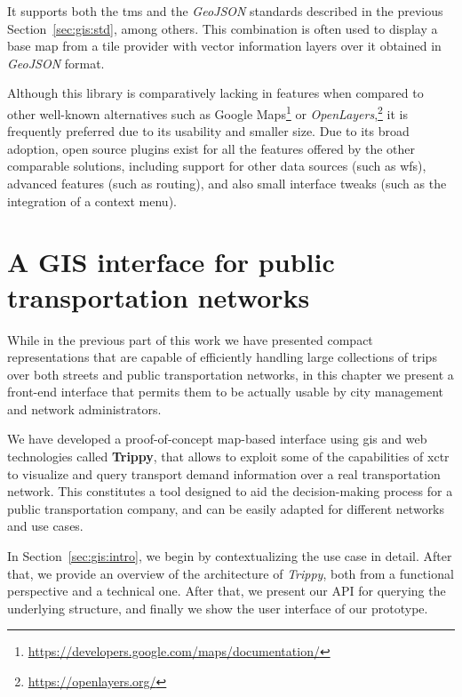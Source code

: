     It supports both the \gls{tms} and the {\em GeoJSON} standards described in the previous Section~\ref{sec:gis:std}, among others. This combination is often used to display a base map from a tile provider with vector information layers over it obtained in {\em GeoJSON} format.
    
    Although this library is comparatively lacking in features when compared to other well-known alternatives such as Google Maps\footnote{\url{https://developers.google.com/maps/documentation/}} or {\em OpenLayers},\footnote{\url{https://openlayers.org/}} it is frequently preferred due to its usability and smaller size. Due to its broad adoption, open source plugins exist for all the features offered by the other comparable solutions, including support for other data sources (such as \gls{wfs}), advanced features (such as routing), and also small interface tweaks (such as the integration of a context menu).
    

\chapter{A GIS interface for public transportation networks}
\label{sec:gis}
	While in the previous part of this work we have presented compact representations that are capable of efficiently handling large collections of trips over both streets and public transportation networks, in this chapter we present a \mbox{front-end} interface that permits them to be actually usable by city management and network administrators.
	
	We have developed a \mbox{proof-of-concept} \mbox{map-based} interface using \gls{gis} and web technologies called \textbf{Trippy}, that allows to exploit some of the capabilities of \gls{xctr} to visualize and query transport demand information over a real transportation network. This constitutes a tool designed to aid the decision-making process for a public transportation company, and can be easily adapted for different networks and use cases.
	
	In Section~\ref{sec:gis:intro}, we begin by contextualizing the use case in detail. After that, we provide an overview of the architecture of {\em Trippy}, both from a functional perspective and a technical one. After that, we present our API for querying the underlying structure, and finally we show the user interface of our prototype.
	
